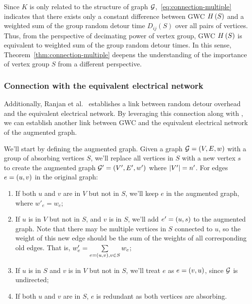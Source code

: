 \documentclass[10pt,twocolumn,twoside]{IEEEtran}
\begin{document}
Since \(K\) is only related to the structure of graph \(\mathcal{G}\),~\eqref{eq:connection-multiple} indicates that there exists only a constant difference between GWC \(H\left(S\right)\) and  a weighted sum of the group random detour time \(D_{ij}(S)\) over all pairs of vertices. Thus, from the perspective of decimating power of vertex group,
GWC \(H\left(S\right)\) is equivalent to weighted sum of the group random detour times. In this sense, Theorem~\ref{thm:connection-multiple} deepens the understanding of the importance of vertex group \(S\) from a different perspective.



\subsubsection{Connection with the equivalent electrical network}

Additionally, Ranjan et al.~\cite{RaZh13} establishes a link between random detour overhead and the equivalent electrical network.
By leveraging this connection along with , we can establish another link between GWC and the equivalent electrical network of the augmented graph.

We'll start by defining the augmented graph.
Given a graph \(\mathcal{G}=\left( V,E,w \right)\) with a group of absorbing vertices \(S\), we'll replace all vertices in \(S\) with a new vertex \(s\) to create the augmented graph \(\mathcal{G}'=\left( V',E',w' \right)\) where \(\left|V' \right|=n'\).
For edges \(e=\left( u,v \right)\) in the original graph:
\begin{enumerate}
    \item If both \(u\) and \(v\) are in \(V\) but not in \(S\), we'll keep \(e\) in the augmented graph, where \(w'_e=w_e\);
    \item If \(u\) is in \(V\) but not in \(S\), and \(v\) is in \(S\), we'll add \(e'=\left( u,s \right)\) to the augmented graph. Note that there may be multiple vertices in \(S\) connected to \(u\), so the weight of this new edge should be the sum of the weights of all corresponding old edges. That is, \(w'_e=\sum\limits_{e=\left( u,v \right),v\in S}w_e\);
    \item If \(u\) is in \(S\) and \(v\) is in \(V\) but not in \(S\), we'll treat \(e\) as \(e=\left( v,u \right)\), since \(\mathcal{G}\) is undirected;
    \item If both \(u\) and \(v\) are in \(S\), \(e\) is redundant as both vertices are absorbing.
\end{enumerate}
\end{document}
